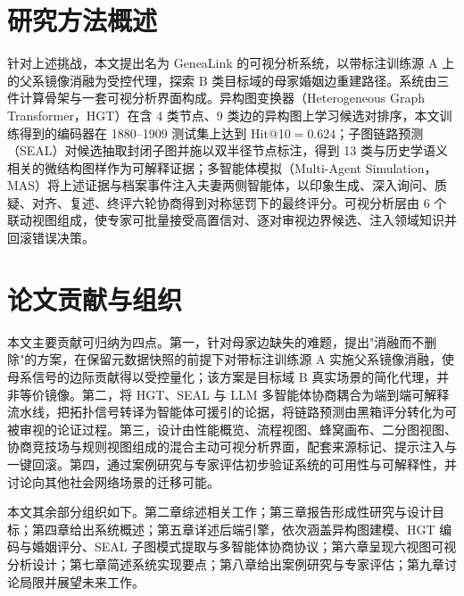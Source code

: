 \section{研究方法概述}\label{sec:approach-overview}

针对上述挑战，本文提出名为 GeneaLink 的可视分析系统，以带标注训练源 A 上的父系镜像消融为受控代理，探索 B 类目标域的母家婚姻边重建路径。系统由三件计算骨架与一套可视分析界面构成。异构图变换器（Heterogeneous Graph Transformer，HGT）\citep{hu2020hgt}在含 4 类节点、9 类边的异构图上学习候选对排序，本文训练得到的编码器在 1880--1909 测试集上达到 Hit@10$=0.624$；子图链路预测（SEAL）\citep{zhang2018seal}对候选抽取封闭子图并施以双半径节点标注，得到 13 类与历史学语义相关的微结构图样作为可解释证据；多智能体模拟（Multi-Agent Simulation，MAS）将上述证据与档案事件注入夫妻两侧智能体，以印象生成、深入询问、质疑、对齐、复述、终评六轮协商得到对称惩罚下的最终评分。可视分析层由 6 个联动视图组成，使专家可批量接受高置信对、逐对审视边界候选、注入领域知识并回滚错误决策。

\section{论文贡献与组织}\label{sec:contribution}

本文主要贡献可归纳为四点。第一，针对母家边缺失的难题，提出"消融而不删除"的方案，在保留元数据快照的前提下对带标注训练源 A 实施父系镜像消融，使母系信号的边际贡献得以受控量化；该方案是目标域 B 真实场景的简化代理，并非等价镜像。第二，将 HGT、SEAL 与 LLM 多智能体协商耦合为端到端可解释流水线，把拓扑信号转译为智能体可援引的论据，将链路预测由黑箱评分转化为可被审视的论证过程。第三，设计由性能概览、流程视图、蜂窝画布、二分图视图、协商竞技场与规则视图组成的混合主动可视分析界面，配套来源标记、提示注入与一键回滚。第四，通过案例研究与专家评估初步验证系统的可用性与可解释性，并讨论向其他社会网络场景的迁移可能。

本文其余部分组织如下。第二章综述相关工作；第三章报告形成性研究与设计目标；第四章给出系统概述；第五章详述后端引擎，依次涵盖异构图建模、HGT 编码与婚姻评分、SEAL 子图模式提取与多智能体协商协议；第六章呈现六视图可视分析设计；第七章简述系统实现要点；第八章给出案例研究与专家评估；第九章讨论局限并展望未来工作。
